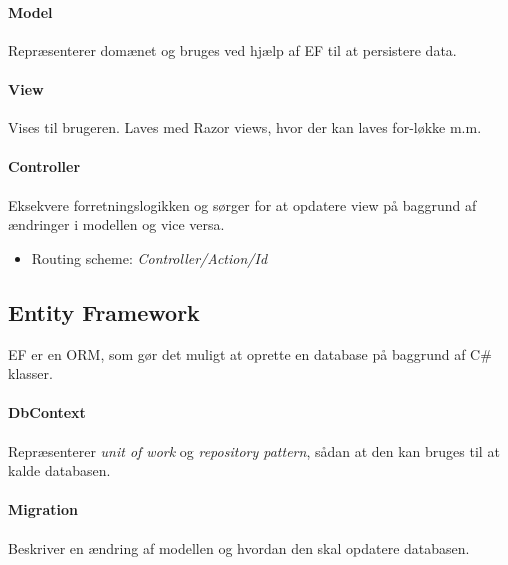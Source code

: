 \paragraph{Model} Repræsenterer domænet og bruges ved hjælp af EF til at persistere data.

\paragraph{View} Vises til brugeren. Laves med Razor views, hvor der kan laves for-løkke m.m.

\paragraph{Controller} Eksekvere forretningslogikken og sørger for at opdatere view på baggrund af ændringer i modellen og vice versa.

\begin{itemize}
	\item Routing scheme: \textit{Controller/Action/Id}
\end{itemize}

\subsection{Entity Framework}
EF er en ORM, som gør det muligt at oprette en database på baggrund af C\# klasser.

\paragraph{DbContext}
Repræsenterer \textit{unit of work} og \textit{repository pattern}, sådan at den kan bruges til at kalde databasen.

\paragraph{Migration} Beskriver en ændring af modellen og hvordan den skal opdatere databasen.

